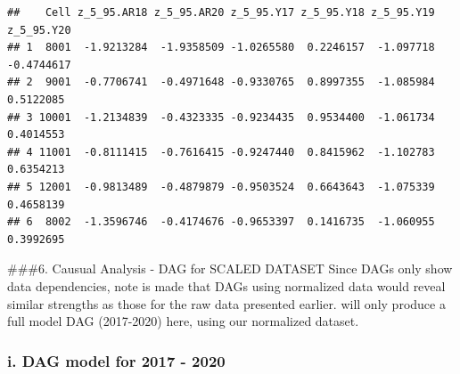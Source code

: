 \documentclass[
]{article}
\begin{document}
\begin{verbatim}
##    Cell z_5_95.AR18 z_5_95.AR20 z_5_95.Y17 z_5_95.Y18 z_5_95.Y19 z_5_95.Y20
## 1  8001  -1.9213284  -1.9358509 -1.0265580  0.2246157  -1.097718 -0.4744617
## 2  9001  -0.7706741  -0.4971648 -0.9330765  0.8997355  -1.085984  0.5122085
## 3 10001  -1.2134839  -0.4323335 -0.9234435  0.9534400  -1.061734  0.4014553
## 4 11001  -0.8111415  -0.7616415 -0.9247440  0.8415962  -1.102783  0.6354213
## 5 12001  -0.9813489  -0.4879879 -0.9503524  0.6643643  -1.075339  0.4658139
## 6  8002  -1.3596746  -0.4174676 -0.9653397  0.1416735  -1.060955  0.3992695
\end{verbatim}

\#\#\#6. Causual Analysis - DAG for SCALED DATASET Since DAGs only show
data dependencies, note is made that DAGs using normalized data would
reveal similar strengths as those for the raw data presented earlier.
will only produce a full model DAG (2017-2020) here, using our
normalized dataset.

\subsubsection{i. DAG model for 2017 -
2020}\label{i.-dag-model-for-2017---2020}
\end{document}
